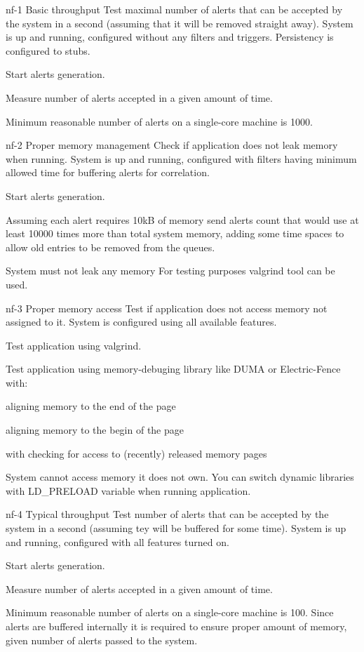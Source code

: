 \testCase
{nf-1}
{Basic throughput}
{Test maximal number of alerts that can be accepted by the system in a second (assuming that it will be removed straight away).}
{System is up and running, configured without any filters and triggers. Persistency is configured to stubs.}
{
\begin{enumerate*}
\item Start alerts generation.
\item Measure number of alerts accepted in a given amount of time.
\end{enumerate*}
}
{Minimum reasonable number of alerts on a single-core machine is 1000.}
{}


\testCase
{nf-2}
{Proper memory management}
{Check if application does not leak memory when running.}
{System is up and running, configured with filters having minimum allowed time for buffering alerts for correlation.}
{
\begin{enumerate*}
\item Start alerts generation.
\item Assuming each alert requires 10kB of memory send alerts count that would use at least 10000 times more than total system memory, adding some time spaces to allow old entries to be removed from the queues.
\end{enumerate*}
}
{System must not leak any memory}
{For testing purposes valgrind tool can be used.}


\testCase
{nf-3}
{Proper memory access}
{Test if application does not access memory not assigned to it.}
{System is configured using all available features.}
{
\begin{enumerate*}
\item Test application using valgrind.
\item Test application using memory-debuging library like DUMA or Electric-Fence with:
  \begin{enumerate*}
  \item aligning memory to the end of the page
  \item aligning memory to the begin of the page
  \item with checking for access to (recently) released memory pages
  \end{enumerate*}
\end{enumerate*}
}
{System cannot access memory it does not own.}
{You can switch dynamic libraries with LD\_PRELOAD variable when running application.}


\testCase
{nf-4}
{Typical throughput}
{Test number of alerts that can be accepted by the system in a second (assuming tey will be buffered for some time).}
{System is up and running, configured with all features turned on.}
{
\begin{enumerate*}
\item Start alerts generation.
\item Measure number of alerts accepted in a given amount of time.
\end{enumerate*}
}
{Minimum reasonable number of alerts on a single-core machine is 100.}
{Since alerts are buffered internally it is required to ensure proper amount of memory, given number of alerts passed to the system.}


